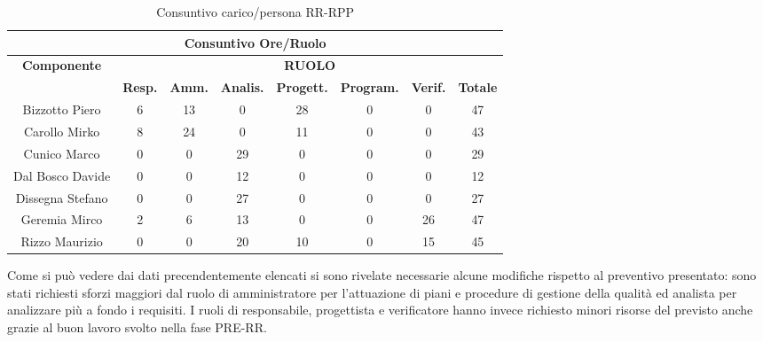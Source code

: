 \begin{table}[!h]
	\begin{center}
		  \begin{tabular}
			  {|c|c|c|c|c|c|c|c|}
		 \hline
			\multicolumn{8}{|c|}{ \textbf{Consuntivo Ore/Ruolo} } \\
			\hline
			\textbf{Componente} & \multicolumn{7}{|c|}{ \textbf{RUOLO} } \\
			\hline
			& \textbf{Resp.} & \textbf{Amm.} & \textbf{Analis.} & \textbf{Progett.} & \textbf{Program.} & \textbf{Verif.}  & \textbf{Totale}\\
			\hline
			Bizzotto Piero &  6   &  13 &  0   &   28  &  0   &  0  &  47 \\ %
			\hline
			Carollo Mirko &  8   &  24  &  0  &  11   &  0   &  0   &  43\\ %
			\hline
			Cunico Marco    &  0   &  0  &  29   &  0   &  0  &  0   &  29\\ %
			\hline
			Dal Bosco Davide   &  0   &  0   &  12   &  0   &   0  &  0  &  12\\ %
			\hline
			Dissegna Stefano        &  0  &  0   & 27  &  0   &  0  &  0  &  27\\ %
			\hline
			Geremia Mirco   &   2  &  6   &  13  &  0  &  0   &  26   &  47\\ %
			\hline	
			Rizzo Maurizio  &  0  &  0  &  20  &  10  &  0  &  15  &  45 \\ %
			\hline	
		\end{tabular}
	\caption{Consuntivo carico/persona RR-RPP} %
	\label{tab: ConsPersOre_RR-RPP}
	\end{center}	
\end{table}

Come si pu\`o vedere dai dati precendentemente elencati si sono rivelate necessarie alcune modifiche rispetto al preventivo presentato:
sono stati richiesti sforzi maggiori dal ruolo di amministratore per l'attuazione di piani e procedure di gestione della qualit\`a ed
analista per analizzare pi\`u a fondo i requisiti. I ruoli di responsabile, progettista e verificatore hanno invece richiesto minori
risorse del previsto anche grazie al buon lavoro svolto nella fase PRE-RR.

